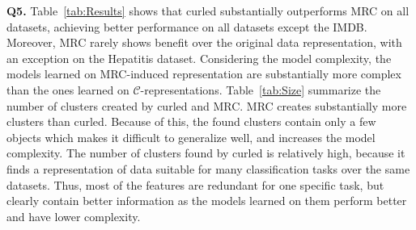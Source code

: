 \begin{table}
\captionsetup{justification=centerlast}
\begin{center}
	\caption{Model selection results. For each dataset, a selected parameters are reported together with the accuracies on the training and test sets. The first element indicates the selected clustering algorithm (S-spectral, H-hierarchical), the second one the clustering selection criteria, while the last one indicates the hyperedge similarity (C-combination, M-merging). The last column indicates the performance on the original data representation. }
    \label{tab:MS}

\end{center}

\end{table}




\textbf{Q5.}
Table~\ref{tab:Results} shows that \gls{curled} substantially outperforms MRC on all datasets, achieving better performance on all datasets except the IMDB.
Moreover, MRC rarely shows benefit over the original data representation, with an exception on the Hepatitis dataset.
Considering the model complexity, the models learned on MRC-induced representation are substantially more complex than the ones learned on $\mathcal{C}$-representations.
Table~\ref{tab:Size} summarize the number of clusters created by \gls{curled} and MRC.
MRC creates substantially more clusters than \gls{curled}. 
Because of this, the found clusters contain only a few objects which makes it difficult to generalize well, and increases the model complexity.
The number of clusters found by \gls{curled} is relatively high, because it finds a representation of data suitable for many classification tasks over the same datasets.
Thus, most of the features are redundant for one specific task, but clearly contain better information as the models learned on them perform better and have lower complexity.


